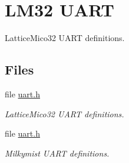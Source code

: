 \hypertarget{group__lm32__uart}{}\section{L\+M32 U\+A\+RT}
\label{group__lm32__uart}


Lattice\+Mico32 U\+A\+RT definitions.  


\subsection*{Files}
\begin{DoxyCompactItemize}
\item 
file \mbox{\hyperlink{lm32_2shared_2console_2uart_8h}{uart.\+h}}
\begin{DoxyCompactList}\small\item\em Lattice\+Mico32 U\+A\+RT definitions. \end{DoxyCompactList}\item 
file \mbox{\hyperlink{lm32_2shared_2milkymist__console_2uart_8h}{uart.\+h}}
\begin{DoxyCompactList}\small\item\em Milkymist U\+A\+RT definitions. \end{DoxyCompactList}\end{DoxyCompactItemize}
